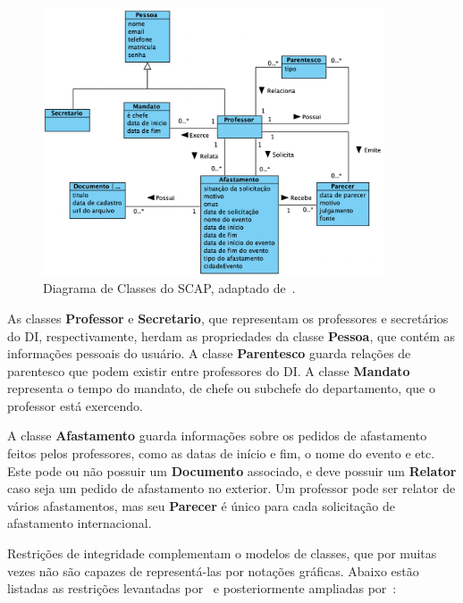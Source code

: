 \begin{figure}
    \centering  
    \includegraphics[width=0.9\textwidth]{figuras/fig-diagrama-classes.png}
    \caption{Diagrama de Classes do SCAP, adaptado de~\cite{prado:2015}.}
    \label{fig:diagrama-classes}
\end{figure}

As classes \textbf{Professor} e \textbf{Secretario}, que representam os professores
e secretários do DI, respectivamente, herdam as propriedades da classe \textbf{Pessoa},
que contém as informações pessoais do usuário. A classe \textbf{Parentesco} 
guarda relações de parentesco que podem existir entre professores do DI.
A classe \textbf{Mandato} representa o tempo do mandato, de chefe ou subchefe do departamento,
que o professor está exercendo.

A classe \textbf{Afastamento} guarda informações sobre os pedidos de afastamento
feitos pelos professores, como as datas de início e fim, o nome do evento e etc.
Este pode ou não possuir um \textbf{Documento} associado, e deve possuir um \textbf{Relator}
caso seja um pedido de afastamento no exterior. Um professor pode ser relator de vários afastamentos,
mas seu \textbf{Parecer} é único para cada solicitação de afastamento internacional.


Restrições de integridade complementam o modelos de classes, que por muitas vezes não são
capazes de representá-las por notações gráficas. Abaixo estão listadas as restrições
levantadas por~ e posteriormente ampliadas por~:

